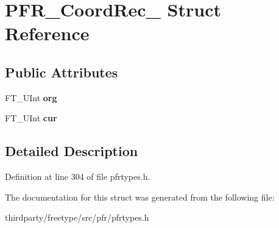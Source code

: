 \hypertarget{struct_p_f_r___coord_rec__}{}\section{P\+F\+R\+\_\+\+Coord\+Rec\+\_\+ Struct Reference}
\label{struct_p_f_r___coord_rec__}
\subsection*{Public Attributes}
\begin{DoxyCompactItemize}
\item 
\mbox{\label{struct_p_f_r___coord_rec___a363bd9399270097988c712a7a826130b}} 
F\+T\+\_\+\+U\+Int {\bfseries org}
\item 
\mbox{\label{struct_p_f_r___coord_rec___a3c7cb005ccd141e1d7cb64aef6b95b9a}} 
F\+T\+\_\+\+U\+Int {\bfseries cur}
\end{DoxyCompactItemize}


\subsection{Detailed Description}


Definition at line 304 of file pfrtypes.\+h.



The documentation for this struct was generated from the following file\+:\begin{DoxyCompactItemize}
\item 
thirdparty/freetype/src/pfr/pfrtypes.\+h\end{DoxyCompactItemize}

